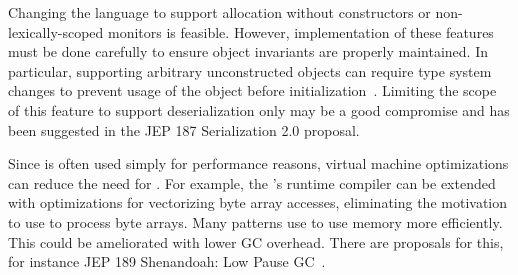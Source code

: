 Changing the language to support allocation without constructors or non-lexically-scoped monitors is feasible.
However, implementation of these
features must be done carefully to ensure object invariants
are properly maintained.
In particular, supporting arbitrary unconstructed
objects can require type system changes to prevent usage of the object 
before initialization~\citep{qiMaskedTypesSound2009}.
Limiting the scope of this feature to support deserialization only may be a good compromise and
has been suggested in the JEP 187 Serialization 2.0 proposal.

Since \unsafe{} is often used simply for performance reasons,
virtual machine optimizations can reduce the need for \unsafe{}.
For example, the \jvm{}'s runtime compiler can be extended with optimizations for vectorizing byte array accesses,
eliminating the motivation to use \unsafe{} to process byte arrays.
Many patterns use \unsafe{} to use memory more efficiently.
This could be ameliorated with lower GC overhead.
There are proposals for this, for instance JEP 189 Shenandoah:
Low Pause GC~\citep{jep189}.
